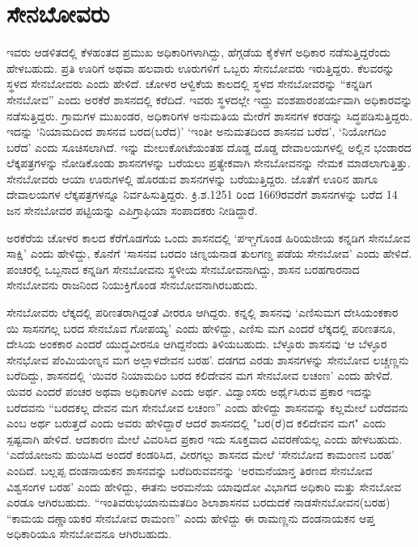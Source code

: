 \section{ಸೇನಬೋವರು}

ಇವರು ಆಡಳಿತದಲ್ಲಿ ಕೆಳಹಂತದ ಪ್ರಮುಖ ಅಧಿಕಾರಿಗಳಾಗಿದ್ದು, ಹೆಗ್ಗಡೆಯ ಕೈಕೆಳಗೆ ಅಧಿಕಾರ ನಡೆಸುತ್ತಿದ್ದರೆಂದು ಹೇಳಬಹುದು. ಪ್ರತಿ ಊರಿಗೆ ಅಥವಾ ಹಲವಾರು ಊರುಗಳಿಗೆ ಒಬ್ಬರು ಸೇನಬೋವರು ಇರುತ್ತಿದ್ದರು. ಕೆಲವರನ್ನು ಸ್ಥಳದ ಸೇನಬೋವರು ಎಂದು ಹೇಳಿದೆ. ಚೋಳರ ಆಳ್ವಿಕೆಯ ಕಾಲದಲ್ಲಿ ಸ್ಥಳದ ಸೇನಬೋವರನ್ನು “ಕನ್ನಡಿಗ ಸೇನಬೋವ” ಎಂದು ಅರಕೆರೆ ಶಾಸನದಲ್ಲಿ ಕರೆದಿದೆ. ಇವರು ಸ್ಥಳದಲ್ಲೇ ಇದ್ದು ವಂಶಪಾರಂಪರ್ಯವಾಗಿ ಅಧಿಕಾರವನ್ನು ನಡೆಸುತ್ತಿದ್ದರು. ಗ್ರಾಮಗಳ ಮುಖಂಡರ, ಅಧಿಕಾರಿಗಳ ಅನುಮತಿಯ ಮೇರೆಗೆ ಶಾಸನಗಳ ಕರಡನ್ನು ಸಿದ್ಧಪಡಿಸುತ್ತಿದ್ದರು. ಇದನ್ನು ‘ನಿಯಾಮದಿಂದ ಶಾಸನವ ಬರದ(ಬರೆದ)’ ‘ಇಂತೀ ಅನುಮತದಿಂದ ಶಾಸನವ ಬರೆದ’, ‘ನಿಯೋಗದಿಂ ಬರೆದ’ ಎಂದು ಸೂಚಿಸಲಾಗಿದೆ. ಇನ್ನು ಮೇಲುಕೋಟೆಯಂತಹ ದೊಡ್ಡ ದೊಡ್ಡ ದೇವಾಲಯಗಳಲ್ಲಿ ಅಲ್ಲಿನ ಭಂಡಾರದ ಲೆಕ್ಕಪತ್ರಗಳನ್ನು ನೋಡಿಕೊಂಡು ಶಾಸನಗಳನ್ನು ಬರೆಯಲು ಪ್ರತ್ಯೇಕವಾಗಿ ಸೇನಬೋವನನ್ನು ನೇಮಕ ಮಾಡಲಾಗುತ್ತಿತ್ತು. ಸೇನಬೋವರು ಆಯಾ ಊರುಗಳಲ್ಲಿ ಹೊರಡುವ ಶಾಸನಗಳನ್ನು ಬರೆಯು\-ತ್ತಿದ್ದರು. ಜೊತೆಗೆ ಊರಿನ ಹಾಗೂ ದೇವಾಲಯಗಳ ಲೆಕ್ಕಪತ್ರಗಳನ್ನೂ ನಿರ್ವಹಿಸುತ್ತಿದ್ದರು. ಕ್ರಿ.ಶ.1251 ರಿಂದ 1669ರವರೆಗೆ ಶಾಸನಗಳನ್ನು ಬರೆದ 14 ಜನ ಸೇನಬೋವರ ಪಟ್ಟಿಯನ್ನು ಎಪಿಗ್ರಾಫಿಯಾ ಸಂಪಾದಕರು ನೀಡಿದ್ದಾರೆ.

ಅರಕೆರೆಯ ಚೋಳರ ಕಾಲದ ಕೆರೆಗೊಡಗೆಯ ಒಂದು ಶಾಸನದಲ್ಲಿ ‘ಪಞ್ಚಗೊಂಡ ಹಿರಿಯಜೀಯ ಕನ್ನಡಿಗ ಸೇನಬೋವ ಸಾಕ್ಷಿ’ ಎಂದು ಹೇಳಿದ್ದು, ಕೊನೆಗೆ ‘ಸಾಸನವ ಬರದಂ ಚಿಣ್ನಯನಾಡ ತುಲಗಣ್ಡ ಪಡೆಯ ಸೇನಬೋವ’ ಎಂದು ಹೇಳಿದೆ. ಪಂಚರಲ್ಲಿ ಒಬ್ಬನಾದ ಕನ್ನಡಿಗ ಸೇನಬೋವನು ಸ್ಥಳೀಯ ಸೇನಬೋವನಾಗಿದ್ದು, ಶಾಸನ ಬರಹಗಾರನಾದ ಸೇನಬೋವನು ರಾಜನಿಂದ ನಿಯುಕ್ತಿಗೊಂಡ ಸೇನಬೋವನಾಗಿರಬಹುದು.

ಸೇನಬೋವರು ಲೆಕ್ಕದಲ್ಲಿ ಪರಿಣತರಾಗಿದ್ದಂತೆ ವೀರರೂ ಆಗಿದ್ದರು. ಕನ್ನಲ್ಲಿ ಶಾಸನವು ‘ಎಣಿಸುಮಗ ದೇಸಿಯಂಕಕಾರ ಯಿ ಸಾಸನಗಲ್ಲ ಬರದ ಸೇನಬೊವ ಗೋಪಯ್ಯ’ ಎಂದು ಹೇಳಿದ್ದು, ಎಣಿಸು ಮಗ ಎಂದರೆ ಲೆಕ್ಕದಲ್ಲಿ ಪರಿಣತನೂ, ದೇಸಿಯ ಅಂಕಕಾರ ಎಂದರೆ ಯುದ್ಧವೀರನೂ ಆಗಿದ್ದನೆಂದು ತಿಳಿಯಬಹುದು. ಬೆಳ್ಳೂರು ಶಾಸನವು ‘ಆ ಬೆಳ್ಳೂರ ಸೇನಭೋವ ಪೆಂಮಿಯಂಣ್ನನ ಮಗ ಅಲ್ಲಾಳದೇವನ ಬರಹ’. ದಡಗದ ಎರಡು ಶಾಸನಗಳನ್ನು ಸೇನಬೋವ ಲಚ್ಚಣ್ಣನು ಬರೆದಿದ್ದು, ಶಾಸನದಲ್ಲಿ ‘ಯಿವರ ನಿಯಾಮದಿಂ ಬರದ ಕಲಿದೇವನ ಮಗ ಸೇನಬೋವ ಲಚಂಣ’ ಎಂದು ಹೇಳಿದೆ. ಯಿವರ ಎಂದರೆ ಪಂಚರ ಅಥವಾ ಅಧಿಕಾರಿಗಳ ಎಂದು ಅರ್ಥ. ವಿದ್ವಾಂಸರು ಅರ್ಥೈಸಿರುವ ಪ್ರಕಾರ ಇದನ್ನು ಬರೆದವನು “ಬರದಕಲ್ಲ ದೇವನ ಮಗ ಸೇನಬೋವ ಲಚಂಣ” ಎಂದು ಹೇಳಿದ್ದು ಶಾಸನವನ್ನು ಕಲ್ಲಮೇಲೆ ಬರೆದವನು ಎಂಬ ಅರ್ಥ ಬರುತ್ತದೆ ಎಂದು ಅವರು ಹೇಳಿದ್ದಾರೆ ಆದರೆ ಶಾಸನದಲ್ಲಿ "ಬರ(ರೆ)ದ ಕಲಿದೇವನ ಮಗ" ಎಂದು ಸ್ಪಷ್ಟವಾಗಿ ಹೇಳಿದೆ. ಆದಕಾರಣ ಮೇಲೆ ವಿವರಿಸಿದ ಪ್ರಕಾರ ಇದು ಸೂಕ್ತವಾದ ವಿವರಣೆಯಲ್ಲ ಎಂದು ಹೇಳಬಹುದು. ‘ಎದೆಯೋಜನು ಹುಯಿಸಿದ ಅಂದರೆ ಕಂಡರಿಸಿದ, ವೀರಗಲ್ಲು ಶಾಸನದ ಮೇಲೆ ‘ಸೇನಬೋವ ಕಾಮಂಣನ ಬರಹ’ ಎಂದಿದೆ. ಬಲ್ಲಪ್ಪ ದಂಡನಾಯಕನ ಶಾಸನವನ್ನು ಬರೆದಿರುವವನನ್ನು ‘ಅರಮನೆಯಾನ್ತ ತಿರಣದ ಸೇನಬೋವ ವಿಶ್ವಸಂಗಳ ಬರಹ’ ಎಂದು ಹೇಳಿದ್ದು, ಈತನು ಅರಮನೆಯ ಯಾವುದೋ ವಿಭಾಗದ ಅಧಿಕಾರಿ ಮತ್ತು ಸೇನಬೋವ ಎರಡೂ ಆಗಿರಬಹುದು. “ಇಂತಿವರುಭಯಾನುಮತದಿಂ ಶಿಲಾಶಾಸನವ ಬರದುದಕೆ ನಾಡಸೇನಬೋವನ(ಬರಹ) “ಕಾಮಯ ದಣ್ಣಾಯಕರ ಸೇನಬೋವ ರಾಮಂಣ” ಎಂದು ಹೇಳಿದ್ದು ಈ ರಾಮಣ್ಣನು ದಂಡನಾಯಕನ ಆಪ್ತ ಅಧಿಕಾರಿಯೂ ಸೇನಬೋವನೂ ಆಗಿರಬಹುದು.

